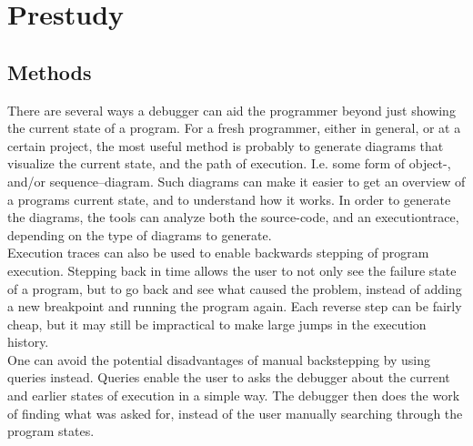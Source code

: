 \section{Prestudy}\label{Prestudy}
\subsection{Methods}\label{PreMethods}
There are several ways a debugger can aid the programmer beyond just showing the current state of a program.
For a fresh programmer, either in general, or at a certain project, the most useful method is probably to generate diagrams that visualize the current state, and the path of execution.
I.e. some form of object-, and/or sequence--diagram.
Such diagrams can make it easier to get an overview of a programs current state, and to understand how it works.
In order to generate the diagrams, the tools can analyze both the source-code, and an \gls{executiontrace}, depending on the type of diagrams to generate.
~\\

Execution traces can also be used to enable backwards stepping of program execution.
Stepping back in time allows the user to not only see the failure state of a program, but to go back and see what caused the problem, instead of adding a new \gls{breakpoint} and running the program again.
Each reverse step can be fairly cheap, but it may still be impractical to make large jumps in the execution history.
~\\

One can avoid the potential disadvantages of manual backstepping by using queries instead.
Queries enable the user to asks the debugger about the current and earlier states of execution in a simple way.
The debugger then does the work of finding what was asked for, instead of the user manually searching through the program states.
~\\
